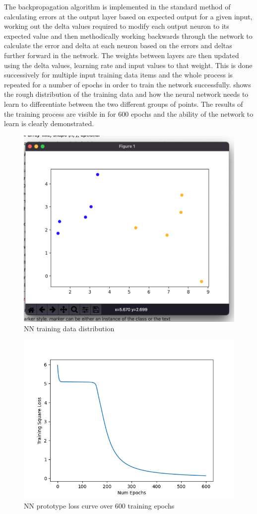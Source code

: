 The backpropagation algorithm is implemented in the standard method of calculating errors at the output layer based on expected output for a given input, working out the delta values required to modify each output neuron to its expected value and then methodically working backwards through the network to calculate the error and delta at each neuron based on the errors and deltas further forward in the network. The weights between layers are then updated using the delta values, learning rate and input values to that weight. This is done successively for multiple input training data items and the whole process is repeated for a number of epochs in order to train the network successfully.  shows the rough distribution of the training data and how the neural network needs to learn to differentiate between the two different groups of points. The results of the training process are visible in  for 600 epochs and the ability of the network to learn is clearly demonstrated.

\begin{figure}[h]
    \centering
    \includegraphics[width=0.5\linewidth]{figures/NN_input_graph.png}
    \caption{NN training data distribution}
    \label{fig:NN_input_graph}
\end{figure}

\begin{figure}[h]
    \centering
    \includegraphics[width=0.6\linewidth]{figures/NN_prototype_600_epochs.png}
    \caption{NN prototype loss curve over 600 training epochs}
    \label{fig:NN_prototype_600_epochs}
\end{figure}

